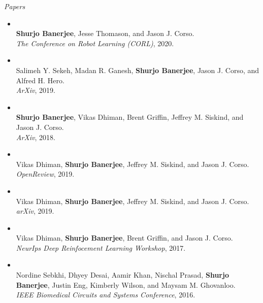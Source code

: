 \documentclass{res}
\newcommand{\citehref}[2]{\href{#1}{\color{darkblue}{#2}}}
\begin{document}
\begin{resume}
{\sl Papers}
\begin{itemize}\item \citehref{https://arxiv.org/abs/2010.12639}{The RobotSlang Benchmark: Dialog-guided Robot Localization and Navigation}\\{\bf Shurjo Banerjee}, Jesse Thomason, and Jason J. Corso.\\\textit{The Conference on Robot Learning (CORL)}, 2020.
\item \citehref{https://arxiv.org/abs/1910.01182}{A Geometric Approach to Online Streaming Feature Selection}\\Salimeh Y. Sekeh, Madan R. Ganesh, {\bf Shurjo Banerjee}, Jason J. Corso, and Alfred H. Hero.\\\textit{ArXiv}, 2019.
\item \citehref{https://arxiv.org/abs/1802.02274}{A Critical Investigation of Deep Reinforcement Learning for Navigation}\\{\bf Shurjo Banerjee}, Vikas Dhiman, Brent Griffin, Jeffrey M. Siskind, and Jason J. Corso.\\\textit{ArXiv}, 2018.
\item \citehref{https://openreview.net/pdf?id=BkesGnCcFX}{Learning goal-conditioned value functions with one-step path rewards rather than goal rewards}\\Vikas Dhiman, {\bf Shurjo Banerjee}, Jeffrey M. Siskind, and Jason J. Corso.\\\textit{OpenReview}, 2019.
\item \citehref{https://openreview.net/pdf?id=BkesGnCcFX}{Floyd-Warshall Reinforcement Learning: Learning from Past Experiences to Reach New Goals}\\Vikas Dhiman, {\bf Shurjo Banerjee}, Jeffrey M. Siskind, and Jason J. Corso.\\\textit{arXiv}, 2019.
\item \citehref{https://drive.google.com/file/d/1WfC6iJEFyJtw9VL6ppvNz03_kcpx1DKj/view}{Do Deep Reinforcement Learning Algorithms really learn to Navigate?}\\Vikas Dhiman, {\bf Shurjo Banerjee}, Brent Griffin, and Jason J. Corso.\\\textit{NeurIps Deep Reinfocement Learning Workshop}, 2017.
\item \citehref{https://ieeexplore.ieee.org/stamp/stamp.jsp?tp=&arnumber=7833730&tag=1}{Towards a wireless multimodal speech capture system}\\Nordine Sebkhi, Dhyey Desai, Aamir Khan, Nischal Prasad, {\bf Shurjo Banerjee}, Justin Eng, Kimberly Wilson, and Maysam M. Ghovanloo.\\\textit{IEEE Biomedical Circuits and Systems Conference}, 2016.
\end{itemize}


\end{resume}
\end{document}
